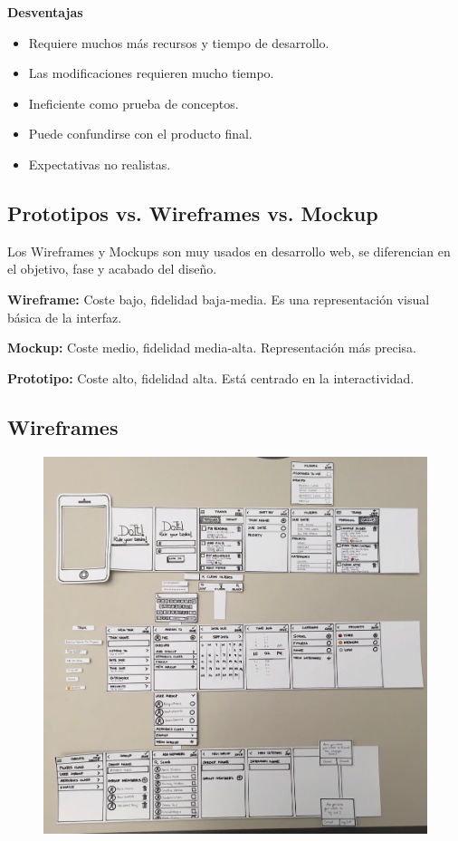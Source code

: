 \documentclass[12pt]{report} %
\begin{document}
  \textbf{Desventajas}
  \begin{itemize}
    \item Requiere muchos más recursos y tiempo de desarrollo.
    \item Las modificaciones requieren mucho tiempo.
    \item Ineficiente como prueba de conceptos.
    \item Puede confundirse con el producto final.
    \item Expectativas no realistas.
  \end{itemize}

\subsection{Prototipos vs. Wireframes vs. Mockup}
Los Wireframes y Mockups son muy usados en desarrollo web, se diferencian en el objetivo, fase y acabado del diseño.

\textbf{Wireframe:} Coste bajo, fidelidad baja-media. Es una representación visual básica de la interfaz.

\textbf{Mockup:} Coste medio, fidelidad media-alta. Representación más precisa.

\textbf{Prototipo:} Coste alto, fidelidad alta. Está centrado en la interactividad.

\subsection{Wireframes}

\begin{figure}[H]
	{\includegraphics[scale=.4]{2021-03-20 23_51_33-L5.pdf - Foxit Reader.png}}
\end{figure}
\end{document}
